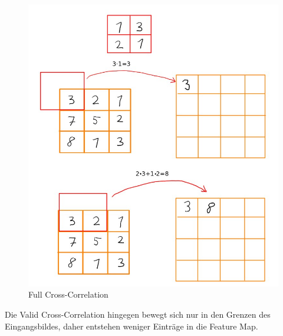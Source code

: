 \documentclass[12pt]{article}
\begin{document}
\begin{figure}[H]
\centering
\includegraphics[scale=0.5]{./Images/Full_Correlation_004.jpg}
\caption{Full Cross-Correlation}
\label{Full Cross-Correlation}
\end{figure}
 
Die Valid Cross-Correlation hingegen bewegt sich nur in den Grenzen des Eingangsbildes, daher entstehen weniger Einträge in die Feature Map.
\end{document}
